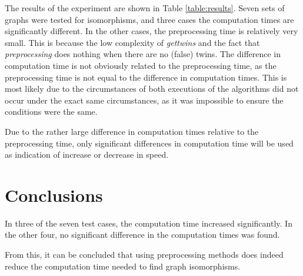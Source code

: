 \documentclass[twoside]{article}
\theoremstyle{definition}
\theoremstyle{plain}
\begin{document}
\begin{multicols}{2}
The results of the experiment are shown in Table \ref{table:results}. Seven sets of graphs were tested for isomorphisms, and three cases the computation times are significantly different. In the other cases, the preprocessing time is relatively very small. This is because the low complexity of \emph{gettwins} and the fact that \emph{preprocessing} does nothing when there are no (false) twins. The difference in computation time is not obviously related to the preprocessing time, as the preprocessing time is not equal to the difference in computation times. This is most likely due to the circumstances of both executions of the algorithms did not occur under the exact same circumstances, as it was impossible to ensure the conditions were the same.  

Due to the rather large difference in computation times relative to the preprocessing time, only significant differences in computation time will be used as indication of increase or decrease in speed.

\section{Conclusions}

In three of the seven test cases, the computation time increased significantly. In the other four, no significant difference in the computation times was found.

From this, it can be concluded that using preprocessing methods does indeed reduce the computation time needed to find graph isomorphisms.


\printbibliography




\end{multicols}
\newpage
\end{document}

